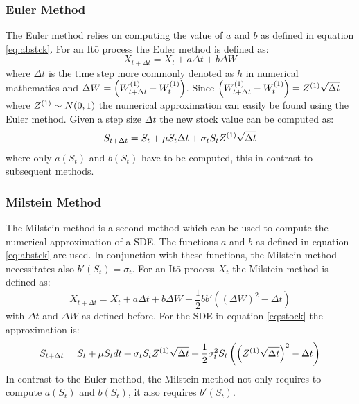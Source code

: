 \documentclass[a4paper,onecolumn,draft]{IEEEtran}
\begin{document}
\subsubsection{Euler Method}
The Euler method relies on computing the value of $a$ and $b$ as defined in
equation \eqref{eq:abstck}. For an It\=o process the Euler method is defined as:
\begin{equation}\label{eq:euler}
X_{t + \Delta t} = X_t + a\Delta t + b\Delta W
\end{equation}
where $\Delta t$ is the time step more commonly denoted as $h$ in numerical
mathematics and $\Delta W = \left(W^{(1)}_{t + \Delta t} - W^{(1)}_t\right)$.
Since $\left(W^{(1)}_{t + \Delta t} - W^{(1)}_t\right) =
Z^{(1)}\sqrt{\Delta t}$ where $Z^{(1)}\sim N(0, 1)$ the numerical
approximation can easily be found using the Euler method. Given a step size
$\Delta t$ the new stock value can be computed as:
\begin{align}
S_{t + \Delta t} = S_t + \mu S_t\Delta t + \sigma_t S_t Z^{(1)}\sqrt{\Delta t}
\end{align}
where only $a(S_t)$ and $b(S_t)$ have to be computed, this in contrast to
subsequent methods.


\subsubsection{Milstein Method}
The Milstein method is a second method which can be used to compute the
numerical approximation of a SDE. The functions $a$ and $b$ as defined in
equation \eqref{eq:abstck} are used. In conjunction with these functions, the
Milstein method necessitates also $b'(S_t) = \sigma_t$. For an It\=o process
$X_t$ the Milstein method is defined as:
\begin{equation}\label{eq:mil}
X_{t + \Delta t} = X_t + a\Delta t + b\Delta W +
\frac{1}{2}bb'\left(\left(\Delta W\right)^2 - \Delta t\right)
\end{equation}
with $\Delta t$ and $\Delta W$ as defined before. For the SDE in
equation \eqref{eq:stock} the approximation is:
\begin{equation}
S_{t + \Delta t} = S_t + \mu S_t dt + \sigma_t S_t Z^{(1)}\sqrt{\Delta t} +
	\frac{1}{2} \sigma_t^2 S_t \left(\left(Z^{(1)}\sqrt{\Delta t}\right)^2 -
\Delta t\right)
\end{equation}
In contrast to the Euler method, the Milstein method not only requires to
compute $a(S_t)$ and $b(S_t)$, it also requires $b'(S_t)$.
\end{document}
